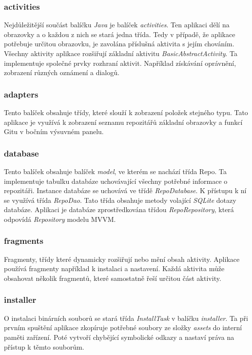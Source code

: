             \newpage
            \subsubsection{activities}
            Nejdůležitější součást balíčku \emph{Java} je balíček \emph{activities}. Ten aplikaci dělí na obrazovky a o každou z nich se stará jedna třída. Tedy v případě, že aplikace potřebuje určitou obrazovku, je zavolána příslušná aktivita s jejím chováním. Všechny aktivity aplikace rozšiřují základní aktivitu \emph{BasicAbstractActivity}. Ta implementuje společné prvky rozhraní aktivit. Například získávání oprávnění, zobrazení různých oznámení a dialogů.

            \subsubsection{adapters}
            Tento balíček obsahuje třídy, které slouží k zobrazení položek stejného typu. Tato aplikace je využívá k zobrazení seznamu repozitářů základní obrazovky a funkcí Gitu v bočním výsuvném panelu.  

            \subsubsection{database}
            Tento balíček obsahuje balíček \emph{model}, ve kterém se nachází třída Repo. Ta implementuje tabulku databáze uchovávající všechny potřebné informace o repozitáři. Instance databáze se uchovává ve třídě \emph{RepoDatabase}. K přístupu k ní se využívá třída \emph{RepoDao}. Tato třída obsahuje metody volající \emph{SQLite} dotazy databáze. Aplikaci je databáze zprostředkována třídou \emph{RepoRepository}, která odpovídá \emph{Repository} modelu MVVM.

            \subsubsection{fragments}
            Fragmenty, třídy které dynamicky rozšiřují nebo mění obsah aktivity. Aplikace používá fragmenty například k instalaci a nastavení. Každá aktivita může obsahovat několik fragmentů, které samostatně řeší určitou část aktivity.

            \subsubsection{installer}
            O instalaci binárních souborů se stará třída \emph{InstallTask} v balíčku \emph{installer}. Ta při prvním spuštění aplikace zkopíruje potřebné soubory ze složky \emph{assets} do interní paměti zařízení. Poté  vytvoří chybějící symbolické odkazy a nastaví práva na přístup k těmto souborům.

